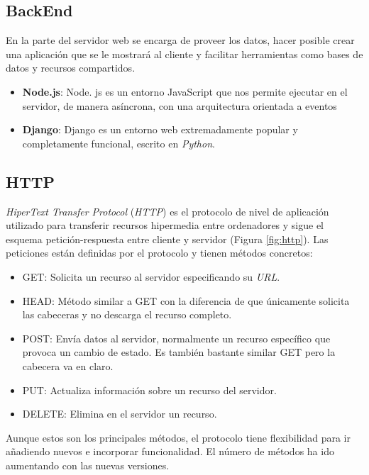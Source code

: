\subsection{BackEnd}
\label{subsec:backend}
En la parte del servidor web se encarga de proveer los datos, hacer posible crear una aplicación que se le mostrará al cliente y facilitar herramientas como bases de datos y recursos compartidos. 
\begin{itemize}
    \item \textbf{Node.js}: Node. js es un entorno JavaScript que nos permite ejecutar en el servidor, de manera asíncrona, con una arquitectura orientada a eventos   
    \item \textbf{Django}: Django es un entorno web extremadamente popular y completamente funcional, escrito en  \textit{Python}. 
\end{itemize}

\subsection{HTTP}
\label{subsec:http}

\textit{HiperText Transfer Protocol} (\textit{HTTP}) es el protocolo de nivel de aplicación utilizado para transferir recursos hipermedia entre ordenadores y sigue el esquema petición-respuesta entre cliente y servidor (Figura \ref{fig:http}). 
Las peticiones están definidas por el protocolo y tienen métodos concretos: 
\begin{itemize}
    \item GET: Solicita un recurso al servidor especificando su \textit{URL}.
    \item HEAD: Método similar a GET con la diferencia de que únicamente solicita las cabeceras y no descarga el recurso completo.
    \item POST: Envía datos al servidor, normalmente un recurso específico que provoca un cambio de estado. Es también bastante similar GET pero la cabecera va en claro. 
    \item PUT: Actualiza información sobre un recurso del servidor. 
    \item DELETE: Elimina en el servidor un recurso.
\end{itemize}

Aunque estos son los principales métodos, el protocolo tiene flexibilidad para ir añadiendo nuevos e incorporar funcionalidad. El número de métodos ha ido aumentando con las nuevas versiones.\newline




